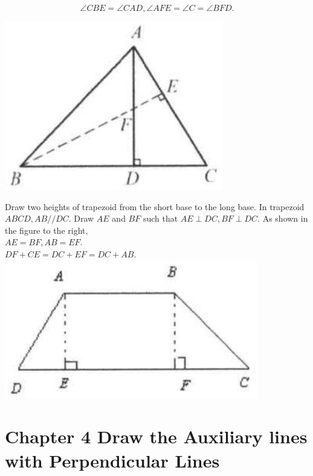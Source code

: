 \documentclass{article}
\begin{document}
\[
\angle C B E=\angle C A D, \angle A F E=\angle C=\angle B F D .
\]

\begin{center}
\includegraphics[width=\textwidth]{images/074(3).jpg}
\end{center}

Draw two heights of trapezoid from the short base to the long base.
In trapezoid \(A B C D, A B / / D C\). Draw \(A E\) and \(B F\) such that \(A E \perp D C, B F \perp D C\). As shown in the figure to the right,\\
\(A E=B F, A B=E F\).\\
\(D F+C E=D C+E F=D C+A B\).\\
\centering
\includegraphics[width=\textwidth]{images/074(2).jpg}

\section*{Chapter 4 Draw the Auxiliary lines with Perpendicular Lines}
\end{document}
